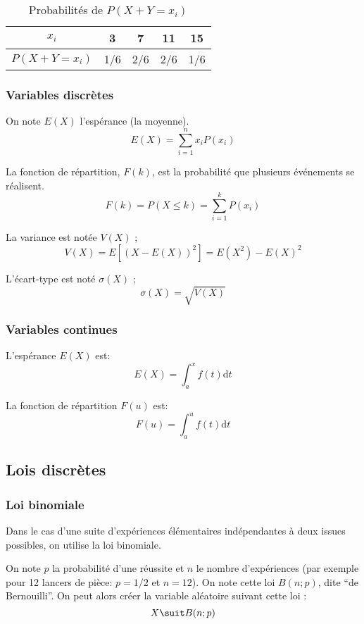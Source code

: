 \documentclass[10pt,a4paper,french]{article}
\begin{document}
\begin{table}[h]
\caption{\label{tab:var-alea-3} Probabilités de $P(X+Y = x_i)$}
\centering
\begin{tabular}{c|cccc}
$x_i$ & 3 & 7 & 11 & 15\\
\hline
$P(X+Y=x_i)$ & 1/6 & 2/6 & 2/6 & 1/6\\
\end{tabular}
\end{table}

\subsubsection{Variables discrètes}

On note $E(X)$ l'espérance (la moyenne).
\[
E(X) = \sum_{i=1}^n x_i P(x_i)
\]

La fonction de répartition, $F(k)$, est la probabilité que plusieurs événements se réalisent.
\[
F(k) = P(X \leq k) = \sum_{i=1}^k P(x_i)
\]

La variance est notée $V(X)$ ;
\[
V(X) = E[(X-E(X))^2] = E(X^2) - E(X)^2
\]

L'écart-type est noté $\sigma(X)$ ;
\[
\sigma(X) = \sqrt{V(X)}
\]

\subsubsection{Variables continues}

L'espérance $E(X)$ est:
\[
E(X)= \int_a^x f(t) \text{d} t
\]

La fonction de répartition $F(u)$ est:
\[
F(u) = \int_a^u f(t) \text{d} t
\]

\subsection{Lois discrètes}

\subsubsection{Loi binomiale}

Dans le cas d'une suite d'expériences élémentaires indépendantes à deux issues possibles, on utilise la loi binomiale.

On note $p$ la probabilité d'une réussite et $n$ le nombre d'expériences (par exemple pour 12 lancers de pièce: $p=1/2$ et $n=12$). On note cette loi $B(n; p)$, dite ``de Bernouilli''. On peut alors créer la variable aléatoire suivant cette loi : \[ X \suit B(n; p) \]
\end{document}
